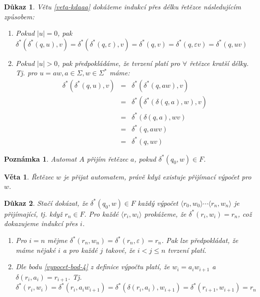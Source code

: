 \documentclass[10pt, a4paper, titlepage]{article}
\theoremstyle{note}
\newtheorem{dukaz}{Důkaz}
\newtheorem{veta}{Věta}
\newtheorem{poznamka}{Poznámka}
\begin{document}
\begin{dukaz}
Větu \ref{veta-kdaaa} dokážeme indukcí přes délku řetězce následujícím způsobem:
\begin{enumerate}
\item
Pokud $|u| = 0$, pak $\delta^*(\delta^*(q,u),v) = \delta^*(\delta^*(q, \varepsilon),v) = \delta^*(q,v) = \delta^*(q, \varepsilon v)
= \delta^*(q,uv)$

\item
Pokud $|u| > 0$, pak předpokládáme, že tvrzení platí pro $\forall$ řetězce kratší délky. Tj. pro $u = aw, a \in \Sigma, w \in \Sigma^*$ máme:
\begin{eqnarray*}
\delta^*(\delta^*(q,u),v) &=& \delta^*(\delta^*(q, aw),v) \\
&=& \delta^*(\delta^*(\delta(q,a),w),v) \\
&=& \delta^*(\delta(q,a),wv) \\
&=& \delta^*(q,awv) \\
&=& \delta^*(q,uv)
\end{eqnarray*}
\end{enumerate}
\end{dukaz}

\begin{poznamka}
Automat $A$ přijím řetězec $a$, pokud $\delta^*(q_0,w) \in F$.
\end{poznamka}

\begin{veta}
Řetězec $w$ je přijat automatem, právě když existuje přijímací výpočet pro $w$.
\end{veta}

\begin{dukaz}
Stačí dokázat, že $\delta^*(q_0,w) \in F$ každý výpočet $\langle r_0, w_0 \rangle \cdots \langle r_n, w_n \rangle$ je přijímající,
tj. když $r_n \in F$. Pro každé $\langle r_i, w_i \rangle$ prokážeme, že $\delta^*(r_i, w_i) = r_n$, což dokazujeme indukcí přes $i$.
\begin{enumerate}
\item
Pro $i = n$ mějme $\delta^*(r_n,w_n) = \delta^*(r_n, \varepsilon) = r_n$. Pak lze předpokládat, že máme nějaké $i$ a pro každé $j$ takové,
že $i < j \leq n$ tvrzení platí.

\item
Dle bodu \ref{vypocet-bod-4} z definice výpočtu platí, že $w_i = a_i w_{i+1}$ a $\delta(r_i, a_i) = r_{i+1}$.
Tj.  $\delta^*(r_i,w_i) = \delta^*(r_i,a_i w_{i+1}) = \delta^*(\delta(r_i, a_i), w_{i+1}) = \delta^*(r_{i+1}, w_{i+1}) = r_n$
\end{enumerate}
\end{dukaz}
\end{document}
